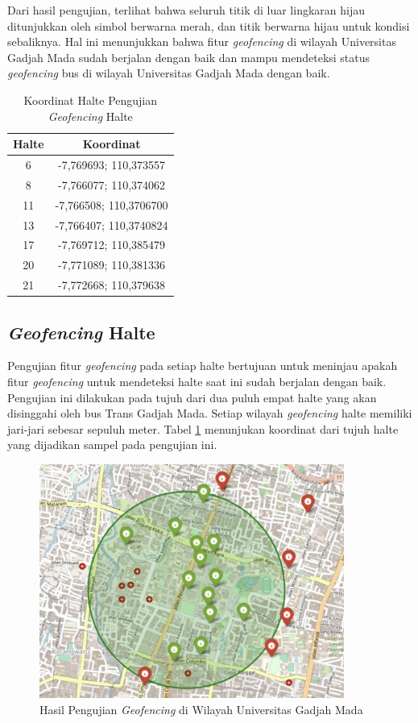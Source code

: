 Dari hasil pengujian, terlihat bahwa seluruh titik di luar lingkaran hijau ditunjukkan oleh simbol berwarna merah, dan titik berwarna hijau untuk kondisi sebaliknya. Hal ini menunjukkan bahwa fitur \textit{geofencing} di wilayah Universitas Gadjah Mada sudah berjalan dengan baik dan mampu mendeteksi status \textit{geofencing} bus di wilayah Universitas Gadjah Mada dengan baik.

\begin{table}[H]
	\caption{Koordinat Halte Pengujian \textit{Geofencing} Halte}
	\vspace{0.5em}
	\centering
	\begin{tabular}{cc}
		\hline
		\textbf{Halte} &\textbf{Koordinat} \\
		\hline
		6 & -7,769693; 110,373557 \\
		8 &-7,766077; 110,374062\\ 
		11 &-7,766508; 110,3706700\\
		13 & -7,766407; 110,3740824\\
		17 &-7,769712; 110,385479\\ 
		20 & -7,771089; 110,381336\\
		21 & -7,772668; 110,379638\\
		\hline
	\end{tabular}
	\label{Tab: geofencing-2}
\end{table}

\subsection{\textit{Geofencing} Halte}
Pengujian fitur \textit{geofencing} pada setiap halte bertujuan untuk meninjau apakah fitur \textit{geofencing} untuk mendeteksi halte saat ini sudah berjalan dengan baik. Pengujian ini dilakukan pada tujuh dari dua puluh empat halte yang akan disinggahi oleh bus Trans Gadjah Mada. Setiap wilayah \textit{geofencing} halte memiliki jari-jari sebesar sepuluh meter. Tabel \ref{Tab: geofencing-2} menunjukan koordinat dari tujuh halte yang dijadikan sampel pada pengujian ini.

\begin{figure}[H]
	\centering
	\includegraphics[width=10cm]{contents/chapter-4/geofencing/wilayah-ugm.jpg}
	\caption{Hasil Pengujian \textit{Geofencing} di Wilayah Universitas Gadjah Mada}
	\label{Fig: geofencing-1}
\end{figure}

